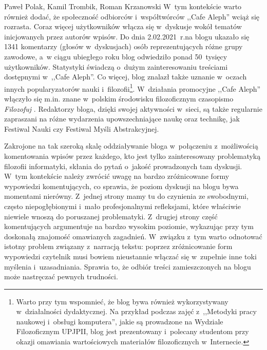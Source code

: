 \begin{newrevplenv}{Paweł Polak, Kamil Trombik, Roman Krzanowski}
W~tym kontekście warto również dodać, że społeczność odbiorców i~współtwórców ,,Cafe Aleph'' wciąż się rozrasta. Coraz więcej użytkowników włącza się w~dyskusje wokół tematów inicjowanych przez autorów wpisów. Do dnia 2.02.2021~r.na blogu ukazało się 1341 komentarzy (głosów w~dyskusjach) osób reprezentujących różne grupy zawodowe, a~w ciągu ubiegłego roku blog odwiedziło ponad 50~tysięcy użytkowników. Statystyki świadczą o~dużym zainteresowaniu treściami dostępnymi w~,,Cafe Aleph''. Co więcej, blog znalazł także uznanie w~oczach innych popularyzatorów nauki i~filozofii\footnote{Warto przy tym wspomnieć, że blog bywa również wykorzystywany w~działalności dydaktycznej. Na przykład podczas zajęć z~,,Metodyki pracy naukowej i~obsługi komputera'', jakie są prowadzone na Wydziale Filozoficznym UPJPII, blog jest prezentowany i~polecany studentom przy okazji omawiania wartościowych materiałów filozoficznych w~Internecie.}. W~działania promocyjne ,,Cafe Aleph'' włączyło się m.in. znane w~polskim środowisku filozoficznym czasopismo \textit{Filozofuj}
\parencite{stacewicz_filozofuj_2020}. %
Redaktorzy bloga, dzięki swojej aktywności w~sieci, są także regularnie zapraszani na różne wydarzenia upowszechniające naukę oraz technikę, jak Festiwal Nauki czy Festiwal Myśli Abstrakcyjnej.

Zakrojone na tak szeroką skalę oddziaływanie bloga w~połączeniu z~możliwością komentowania wpisów przez każdego, kto jest tylko zainteresowany problematyką filozofii informatyki, skłania do pytań o~jakość prowadzonych tam dyskusji. W~tym kontekście należy zwrócić uwagę na bardzo zróżnicowane formy wypowiedzi komentujących, co sprawia, że poziom dyskusji na blogu bywa momentami nierówny. Z~jednej strony mamy tu do czynienia ze swobodnymi, często niepogłębionymi i~mało profesjonalnymi refleksjami, które właściwie niewiele wnoszą do poruszanej problematyki. Z~drugiej strony część komentujących argumentuje na bardzo wysokim poziomie, wykazując przy tym doskonałą znajomość omawianych zagadnień. W~związku z~tym warto odnotować istotny problem związany z~narracją tekstu: poprzez zróżnicowanie form wypowiedzi czytelnik musi bowiem nieustannie włączać się w~zupełnie inne toki myślenia i~uzasadniania. Sprawia to, że odbiór treści zamieszczonych na blogu może nastręczać pewnych trudności.


\end{newrevplenv}

